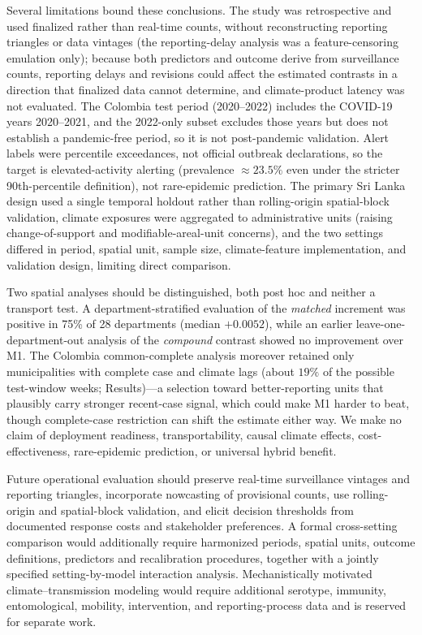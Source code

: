\documentclass[11pt,a4paper]{article}
\begin{document}
Several limitations bound these conclusions. The study was retrospective and used finalized rather than real-time counts, without reconstructing reporting triangles or data vintages (the reporting-delay analysis was a feature-censoring emulation only); because both predictors and outcome derive from surveillance counts, reporting delays and revisions could affect the estimated contrasts in a direction that finalized data cannot determine, and climate-product latency was not evaluated. The Colombia test period (2020--2022) includes the COVID-19 years 2020--2021, and the 2022-only subset excludes those years but does not establish a pandemic-free period, so it is not post-pandemic validation. Alert labels were percentile exceedances, not official outbreak declarations, so the target is elevated-activity alerting (prevalence $\approx23.5\%$ even under the stricter 90th-percentile definition), not rare-epidemic prediction. The primary Sri Lanka design used a single temporal holdout rather than rolling-origin spatial-block validation, climate exposures were aggregated to administrative units (raising change-of-support and modifiable-areal-unit concerns), and the two settings differed in period, spatial unit, sample size, climate-feature implementation, and validation design, limiting direct comparison.

Two spatial analyses should be distinguished, both post hoc and neither a transport test. A department-stratified evaluation of the \emph{matched} increment was positive in 75\% of 28 departments (median $+0.0052$), while an earlier leave-one-department-out analysis of the \emph{compound} contrast showed no improvement over M1. The Colombia common-complete analysis moreover retained only municipalities with complete case and climate lags (about $19\%$ of the possible test-window weeks; Results)---a selection toward better-reporting units that plausibly carry stronger recent-case signal, which could make M1 harder to beat, though complete-case restriction can shift the estimate either way. We make no claim of deployment readiness, transportability, causal climate effects, cost-effectiveness, rare-epidemic prediction, or universal hybrid benefit.

Future operational evaluation should preserve real-time surveillance vintages and reporting triangles, incorporate nowcasting of provisional counts, use rolling-origin and spatial-block validation, and elicit decision thresholds from documented response costs and stakeholder preferences. A formal cross-setting comparison would additionally require harmonized periods, spatial units, outcome definitions, predictors and recalibration procedures, together with a jointly specified setting-by-model interaction analysis. Mechanistically motivated climate--transmission modeling would require additional serotype, immunity, entomological, mobility, intervention, and reporting-process data and is reserved for separate work.
\end{document}
